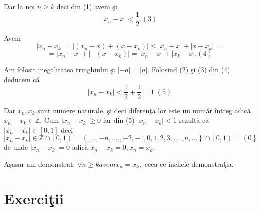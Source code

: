 \documentclass[a4paper,12pt,oneside]{report}
\begin{document}
Dar la noi \(n\geq k\) deci din (1) avem \c si 
\begin{displaymath}
  \left | x_{n}-x \right |< \frac{1}{2}.(3)
\end{displaymath}


Avem 
\begin{displaymath}
  \left | x_{n}-x_{k} \right |= \left | (x_{n}-x)+(x-x_{k}) \right |\leq \left | x_{n}-x \right |+\left | x-x_{k} \right |= 
\end{displaymath}
\begin{displaymath}
  =\left | x_{n}-x \right |+ \left | -(x-x_{k}) \right |= \left | x_{n}-x \right |+ \left | x_{k} -x\right |. (4)
\end{displaymath}



Am folosit inegalitatea tringhiului \c si \(\left | -a \right |= \left | a \right |\). Folosind (2) \c si (3) din (4) deducem c\u a 
\begin{displaymath}
  \left | x_{n}-x_{k} \right |< \frac{1}{2}+ \frac{1}{2}= 1. (5) 
\end{displaymath}


Dar \(x_{n}, x_{k}\) sunt numere naturale, \c si deci diferen\c ta lor este un num\u ar \^ intreg adic\u a \(x_{n}- x_{k}\in \mathbb{Z}\). Cum \(\left |x_{n}- x_{k} \right |\geq 0\) iar din (5) \(\left |x_{n}- x_{k} \right |< 1\) rezult\u a c\u a \(\left |x_{n}- x_{k} \right |\in \left [ 0,1 \right ]\) deci \(\left |x_{n}- x_{k} \right |\in\mathbb{Z}\cap \left [ 0,1 \right)= \left \{ ....,-n ,....,-2,-1,0,1,2,3,....,n,... \right \}\cap \left [ 0,1 \right )= \left \{ 0 \right \}\) de unde \(\left | x_{n}-x_{k} \right |=0\) adic\u a \(x_{n}-x_{k}=0,x_{n}=x_{k}.\) 

A\c sasar am demonstrat: \(\forall n\geq k avem x_{n}=x_{k},\) ceea ce \^ incheie demonstra\c tia. 

\section{Exerci\c tii}
\end{document}
